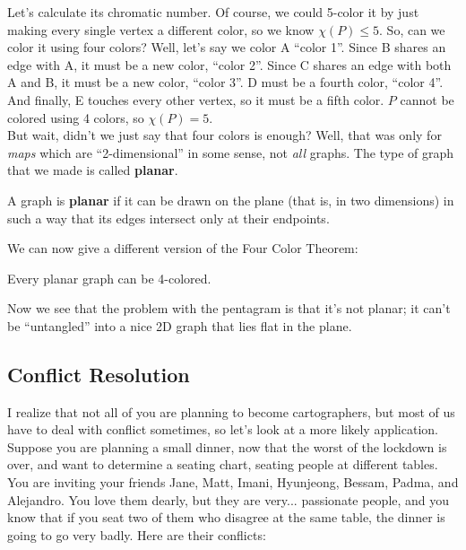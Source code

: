 Let's calculate its chromatic number. Of course, we could 5-color it by just making every single vertex a different color, so we know $\chi(P) \leq 5$. 
So, can we color it using four colors? Well, let's say we color A ``color 1''. Since B shares an edge with A, it must be a new color, ``color 2''. Since C shares an edge with both A and B, it must be a new color, ``color 3''. D must be a fourth color, ``color 4''. And finally, E touches every other vertex, so it must be a fifth color. $P$ cannot be colored using 4 colors, so $\chi(P) = 5$.\\



But wait, didn't we just say that four colors is enough? Well, that was only for \textit{maps} which are ``2-dimensional'' in some sense, not \textit{all} graphs. The type of graph that we made is called \textbf{planar}.\\

\begin{definition}{}
A graph is \textbf{planar} if it can be drawn on the plane (that is, in two dimensions) in such a way that its edges intersect only at their endpoints.
\end{definition}

We can now give a different version of the Four Color Theorem:

\begin{theorem}
Every planar graph can be 4-colored.
\end{theorem}

Now we see that the problem with the pentagram is that it's not planar; it can't be ``untangled'' into a nice 2D graph that lies flat in the plane.
\\

\subsection{Conflict Resolution}

I realize that not all of you are planning to become cartographers, but most of us have to deal with conflict sometimes, so let's look at a more likely application.
Suppose you are planning a small dinner, now that the worst of the lockdown is over, and want to determine a seating chart, seating people at different tables.
You are inviting your friends Jane, Matt, Imani, Hyunjeong, Bessam, Padma, and Alejandro. You love them dearly, but they are very... passionate people, and you know that if you seat two of them who disagree at the same table, the dinner is going to go very badly. Here are their conflicts:
\\

